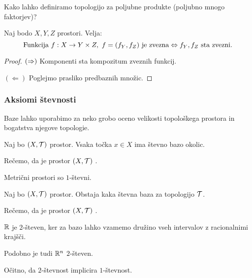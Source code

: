\begin{primer}
    Kako lahko definiramo topologijo za poljubne produkte (poljubno mnogo faktorjev)?
\end{primer}

\begin{trditev}
    Naj bodo $X, Y, Z$ prostori. Velja:
    $$\text{Funkcija } f:X \to Y \times Z, \ f = (f_Y, f_Z) \text{ je zvezna} \Leftrightarrow f_Y, f_Z \text{ sta zvezni}.$$
\end{trditev}

\begin{proof}
    $(\Rightarrow)$ Komponenti sta kompozitum zveznih funkcij.

    $(\Leftarrow)$ Poglejmo prasliko predbaznih množic.
\end{proof}

\subsubsection{Aksiomi števnosti}

Baze lahko uporabimo za neko grobo oceno velikosti topološkega prostora in bogatstva njegove topologie.

\begin{definicija}
    Naj bo $(X, \mathcal{T})$ prostor. Vsaka točka $x \in X$ ima števno bazo okolic.

    Rečemo, da je prostor $(X, \mathcal{T})$ . 
\end{definicija}

\begin{primer}
    Metrični prostori so $1$-števni.
\end{primer}

\begin{definicija}
    Naj bo $(X, \mathcal{T})$ prostor. Obstaja kaka števna baza za topologijo $\mathcal{T}$.

    Rečemo, da je prostor $(X, \mathcal{T})$ . 
\end{definicija}

\begin{primer}
    $\mathbb{R}$ je $2$-števen, ker za bazo lahko vzamemo družino vseh intervalov z racionalnimi krajšči. 
    
    Podobno je tudi $\mathbb{R}^n$ $2$-števen.
\end{primer}

\begin{opomba}
    Očitno, da $2$-števnost implicira $1$-števnost.
\end{opomba}

